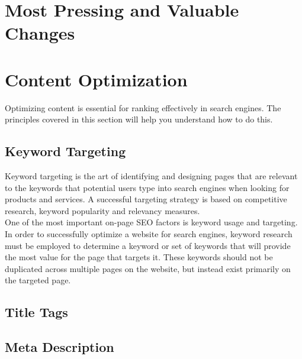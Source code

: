 \documentclass[fleqn,10pt]{SelfArx} %
\begin{document}
\flushbottom %
\maketitle %
\tableofcontents %
\thispagestyle{empty} %
\newpage

\section{Most Pressing and Valuable Changes}


\section{Content Optimization}

\indent Optimizing
content
is
essential
for
ranking
effectively
in
search
engines.
The
principles
covered
in
this
section
will
help
you
understand
how
to
do
this.

\subsection{Keyword Targeting}
Keyword targeting is the art of identifying and designing pages that are relevant to the keywords that potential users type into search engines when looking for products and services. A successful targeting strategy is based on competitive research, keyword popularity and relevancy measures.\\
\newline
One of the most important on-page SEO factors is keyword usage and targeting. 
In order to successfully optimize a website for search engines, keyword research must be employed to determine a keyword or set of keywords that will provide the most value for the page that targets it. These keywords should not be duplicated across multiple pages on the website, but instead exist primarily on the targeted page. 


\subsection{Title Tags}

\subsection{Meta Description}
\end{document}
